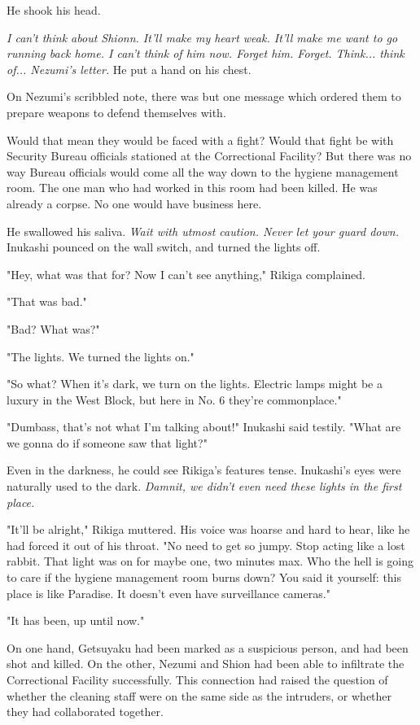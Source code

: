 He shook his head.

\emph{I can't think about Shionn. It'll make my heart weak. It'll make me want
to go running back home. I can't think of him now. Forget him. Forget.
Think... think of... Nezumi's letter.} He put a hand on his chest.

On Nezumi's scribbled note, there was but one message which ordered them
to prepare weapons to defend themselves with.


Would that mean they would be faced with a fight? Would that fight be
with Security Bureau officials stationed at the Correctional Facility?
But there was no way Bureau officials would come all the way down to the
hygiene management room. The one man who had worked in this room had
been killed. He was already a corpse. No one would have business here.

He swallowed his saliva. \emph{Wait with utmost caution. Never let your guard
down.} Inukashi pounced on the wall switch, and turned the lights off.

"Hey, what was that for? Now I can't see anything," Rikiga complained.

"That was bad."

"Bad? What was?"

"The lights. We turned the lights on."

"So what? When it's dark, we turn on the lights. Electric lamps might be
a luxury in the West Block, but here in No. 6 they're commonplace."

"Dumbass, that's not what I'm talking about!" Inukashi said testily.
"What are we gonna do if someone saw that light?"

Even in the darkness, he could see Rikiga's features tense. Inukashi's
eyes were naturally used to the dark. \emph{Damnit, we didn't even need these
lights in the first place.}

"It'll be alright," Rikiga muttered. His voice was hoarse and hard to
hear, like he had forced it out of his throat. "No need to get so jumpy.
Stop acting like a lost rabbit. That light was on for maybe one, two
minutes max. Who the hell is going to care if the hygiene management
room burns down? You said it yourself: this place is like Paradise. It
doesn't even have surveillance cameras."

"It has been, up until now."

On one hand, Getsuyaku had been marked as a suspicious person, and had
been shot and killed. On the other, Nezumi and Shion had been able to
infiltrate the Correctional Facility successfully. This connection had
raised the question of whether the cleaning staff were on the same side
as the intruders, or whether they had collaborated together.

